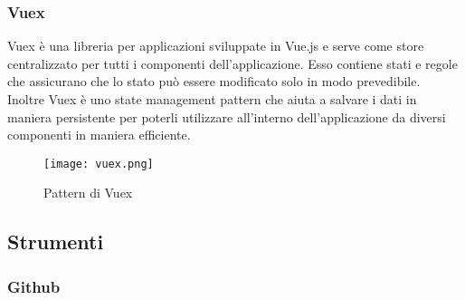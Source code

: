 \subsubsection{Vuex}
Vuex è una libreria  per applicazioni sviluppate in Vue.js e serve come store centralizzato per tutti i componenti dell'applicazione. Esso contiene stati e regole che assicurano che lo stato può essere modificato solo in modo prevedibile.\\
Inoltre Vuex è uno state management pattern che aiuta a salvare i dati in maniera persistente per poterli utilizzare all'interno dell'applicazione da diversi componenti in maniera efficiente.
\begin{figure}[H]
	\begin{center}
		\texttt{[image: vuex.png]}
		\caption{Pattern di Vuex}
	\end{center}
\end{figure}

\subsection{Strumenti}

\subsubsection{Github}

